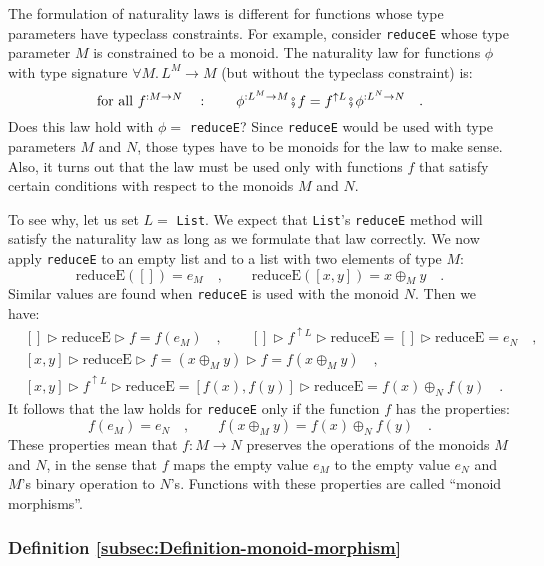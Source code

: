 The formulation of naturality laws is different for functions whose
type parameters have typeclass constraints. For example, consider
\lstinline!reduceE! whose type parameter $M$ is constrained to be
a monoid. The naturality law for functions $\phi$ with type signature
$\forall M.\,L^{M}\rightarrow M$ (but without the typeclass constraint)
is:
\[
\text{for all }f^{:M\rightarrow N}\quad:\quad\quad\phi^{:L^{M}\rightarrow M}\bef f=f^{\uparrow L}\bef\phi^{:L^{N}\rightarrow N}\quad.
\]
Does this law hold with $\phi=$ \lstinline!reduceE!? Since \lstinline!reduceE!
would be used with type parameters $M$ and $N$, those types have
to be monoids for the law to make sense. Also, it turns out that the
law must be used only with functions $f$ that satisfy certain conditions
with respect to the monoids $M$ and $N$. 

To see why, let us set $L=$ \lstinline!List!. We expect that \lstinline!List!\textsf{'}s
\lstinline!reduceE! method will satisfy the naturality law as long
as we formulate that law correctly. We now apply \lstinline!reduceE!
to an empty list and to a list with two elements of type $M$:
\[
\text{reduceE}\left(\left[\right]\right)=e_{M}\quad,\quad\quad\text{reduceE}\left(\left[x,y\right]\right)=x\oplus_{M}y\quad.
\]
Similar values are found when \lstinline!reduceE! is used with the
monoid $N$. Then we have:
\begin{align*}
 & \left[\right]\triangleright\text{reduceE}\triangleright f=f(e_{M})\quad,\quad\quad\left[\right]\triangleright f^{\uparrow L}\triangleright\text{reduceE}=\left[\right]\triangleright\text{reduceE}=e_{N}\quad,\\
 & \left[x,y\right]\triangleright\text{reduceE}\triangleright f=(x\oplus_{M}y)\triangleright f=f(x\oplus_{M}y)\quad,\\
 & \left[x,y\right]\triangleright f^{\uparrow L}\triangleright\text{reduceE}=\left[f(x),f(y)\right]\triangleright\text{reduceE}=f(x)\oplus_{N}f(y)\quad.
\end{align*}
It follows that the law holds for \lstinline!reduceE! only if the
function $f$ has the properties: 
\[
f(e_{M})=e_{N}\quad,\quad\quad f(x\oplus_{M}y)=f(x)\oplus_{N}f(y)\quad.
\]
These properties mean that $f:M\rightarrow N$ preserves the operations
of the monoids $M$ and $N$, in the sense that $f$ maps the empty
value $e_{M}$ to the empty value $e_{N}$ and $M$\textsf{'}s binary operation
to $N$\textsf{'}s. Functions with these properties are called \textsf{``}monoid morphisms\textsf{''}.

\subsubsection{Definition \label{subsec:Definition-monoid-morphism}\ref{subsec:Definition-monoid-morphism}}

